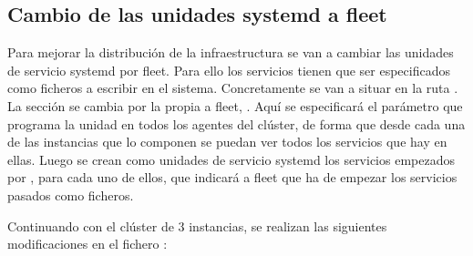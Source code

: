 \subsection{Cambio de las unidades systemd a fleet}

Para mejorar la distribución de la infraestructura se van a cambiar las unidades de servicio systemd por fleet. Para ello los servicios tienen que ser especificados como ficheros a escribir en el sistema. Concretamente se van a situar en la ruta . La sección \kode{[Install]} se cambia por la propia a fleet, \kode{[X-Fleet]}. Aquí se especificará el parámetro  que programa la unidad en todos los agentes del clúster, de forma que desde cada una de las instancias que lo componen se puedan ver todos los servicios que hay en ellas. Luego se crean como unidades de servicio systemd los servicios empezados por , para cada uno de ellos, que indicará a fleet que ha de empezar los servicios pasados como ficheros. 

Continuando con el clúster de 3 instancias, se realizan las siguientes modificaciones en el fichero :

